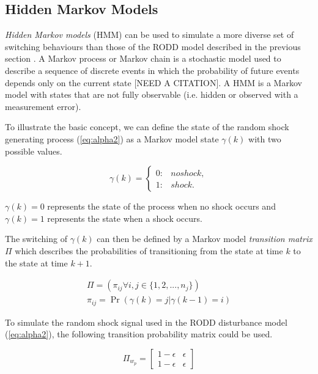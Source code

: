 \subsection{Hidden Markov Models}

\textit{Hidden Markov models} (HMM) can be used to simulate a more diverse set of switching behaviours than those of the RODD model described in the previous section \citep{wong_realistic_2009}. A Markov process or Markov chain is a stochastic model used to describe a sequence of discrete events in which the probability of future events depends only on the current state [NEED A CITATION]. A HMM is a Markov model with states that are not fully observable (i.e. hidden or observed with a measurement error).

To illustrate the basic concept, we can define the state of the random shock generating process (\ref{eq:alpha2}) as a Markov model state $\gamma(k)$ with two possible values.

\begin{equation} \label{eq:gamma-k}
	\gamma(k) = 
	\begin{cases*}
		0: & no shock, \\
		1: & shock.
	\end{cases*}
\end{equation}

$\gamma(k)=0$ represents the state of the process when no shock occurs and $\gamma(k)=1$ represents the state when a shock occurs.

The switching of $\gamma(k)$ can then be defined by a Markov model \textit{transition matrix} $\Pi$ which describes the probabilities of transitioning from the state at time $k$ to the state at time $k+1$.

\begin{equation} \label{eq:Pi}
	\begin{split}
	\Pi = \left(\pi_{ij} \forall i,j\in \{1,2,...,n_j\}\right) \\
	\pi_{ij}=\Pr\left(\gamma(k)=j|\gamma(k-1)=i\right)
	\end{split}
\end{equation}

To simulate the random shock signal used in the RODD disturbance model (\ref{eq:alpha2}), the following transition probability matrix could be used.

\begin{equation} \label{eq:Pi-RODD-step}
	\Pi_{w_{p}} = \begin{bmatrix}
	1-\epsilon & \epsilon \\
	1-\epsilon & \epsilon
	\end{bmatrix}
\end{equation}

